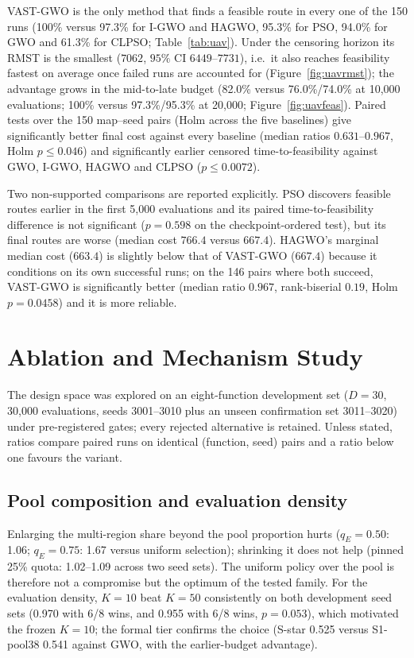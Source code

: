 \documentclass[journal]{IEEEtran}
\newcommand{\method}{VAST-GWO}
\begin{document}
\method{} is the only method that finds a feasible route in every one of the
150 runs (100\% versus 97.3\% for I-GWO and HAGWO, 95.3\% for PSO, 94.0\% for
GWO and 61.3\% for CLPSO; Table~\ref{tab:uav}). Under the censoring horizon its
RMST is the smallest ($7062$, $95\%$ CI $6449$--$7731$), i.e.\ it also reaches
feasibility fastest on average once failed runs are accounted for
(Figure~\ref{fig:uavrmst}); the advantage grows in the mid-to-late budget
(82.0\% versus 76.0\%/74.0\% at 10{,}000 evaluations; 100\% versus
97.3\%/95.3\% at 20{,}000; Figure~\ref{fig:uavfeas}). Paired tests over the
150 map--seed pairs (Holm across the five baselines) give significantly better
final cost against every baseline (median ratios $0.631$--$0.967$, Holm
$p\le 0.046$) and significantly earlier censored time-to-feasibility against
GWO, I-GWO, HAGWO and CLPSO ($p\le 0.0072$).

Two non-supported comparisons are reported explicitly. PSO discovers feasible
routes earlier in the first 5{,}000 evaluations and its paired
time-to-feasibility difference is not significant ($p=0.598$ on the
checkpoint-ordered test), but its final routes are worse (median cost $766.4$
versus $667.4$). HAGWO's marginal median cost ($663.4$) is slightly below that
of \method{} ($667.4$) because it conditions on its own successful runs; on
the 146 pairs where both succeed, \method{} is significantly better (median
ratio $0.967$, rank-biserial $0.19$, Holm $p=0.0458$) and it is more reliable.
\section{Ablation and Mechanism Study}
\label{sec:ablation}
The design space was explored on an eight-function development set
($D=30$, 30{,}000 evaluations, seeds 3001--3010 plus an unseen confirmation
set 3011--3020) under pre-registered gates; every rejected alternative is
retained. Unless stated, ratios compare paired runs on identical
(function, seed) pairs and a ratio below one favours the variant.

\subsection{Pool composition and evaluation density}
Enlarging the multi-region share beyond the pool proportion hurts
($q_E=0.50$: 1.06; $q_E=0.75$: 1.67 versus uniform selection); shrinking it
does not help (pinned 25\% quota: 1.02--1.09 across two seed sets). The
uniform policy over the pool is therefore not a compromise but the optimum
of the tested family. For the evaluation density, $K=10$ beat $K=50$
consistently on both development seed sets (0.970 with 6/8 wins, and 0.955
with 6/8 wins, $p=0.053$), which motivated the frozen $K=10$; the formal
tier confirms the choice (S-star 0.525 versus S1-pool38 0.541 against GWO,
with the earlier-budget advantage).
\end{document}
